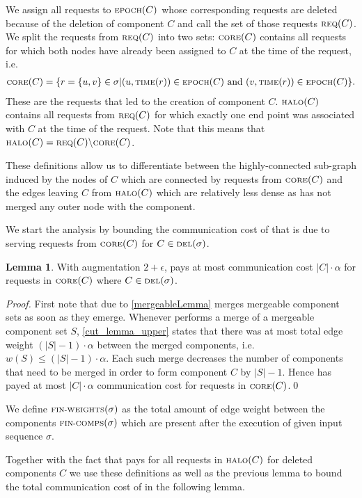 \documentclass[a4paper,xcolor=dvipsnames, tikz, 12pt]{article}
\newcommand{\nl}{\newline}
\newcommand{\crep}{\text{C{\scriptsize REP}}}
\newcommand{\del}{\text{\scriptsize DEL}}
\newcommand{\core}{\text{\scriptsize CORE}}
\newcommand{\halo}{\text{\scriptsize HALO}}
\newcommand{\req}{\text{\scriptsize REQ}}
\newcommand{\finalComps}{\text{\scriptsize FIN-COMPS}}
\newcommand{\finalWeights}{\text{\scriptsize FIN-WEIGHTS}}
\newcommand{\epoch}{\text{\scriptsize EPOCH}}
\newcommand{\reqTime}{\text{\scriptsize TIME}}
\theoremstyle{definition}
\newtheorem{lemma}[defi]{Lemma}
\begin{document}
We assign all requests to $\epoch(C)$ whose corresponding requests are deleted because of the deletion of component $C$ and call the set of those requests $\req(C)$.
We split the requests from $\req{}(C)$ into two sets: $\core(C)$ contains all requests for which both nodes have already been assigned to $C$ at the time of the request, i.e. 
\begin{align*}
\core(C)=\{r=\{u,v\}\in\sigma| (u,\reqTime(r))\in \epoch(C)\text{ and } (v, \reqTime(r))\in \epoch(C)\}.
\end{align*}
These are the requests that led to the creation of component $C$. 
$\halo(C)$ contains all requests from $\req(C)$ for which exactly one end point was associated with $C$ at the time of the request. Note that this means that $\halo(C)=\req(C)\backslash \core(C)$.

These definitions allow us to differentiate between the highly-connected sub-graph induced by the nodes of $C$ which are connected by requests from $\core(C)$ and the edges leaving $C$ from $\halo(C)$ which are relatively less dense as \crep{} has not merged any outer node with the component.

We start the analysis by bounding the communication cost of \crep{} that is due to serving requests from $\core(C)$ for $C\in\del{}(\sigma)$.

\begin{lemma}
	\label{core_comm_upper}
	With augmentation $2+\epsilon$, \crep{} pays at most communication cost $|C|\cdot\alpha$ for requests in $\core(C)$ where $C\in\del{}(\sigma)$.
\end{lemma}

\textit{Proof.} First note that due to \cref{mergeableLemma} \crep{} merges mergeable component sets as soon as they emerge.
Whenever \crep{} performs a merge of a mergeable component set $S$, \cref{cut_lemma_upper} states that there was at most total edge weight $(|S|-1)\cdot\alpha$ between the merged components, i.e. $w(S)\leq(|S|-1)\cdot\alpha$. Each such merge decreases the number of components that need to be merged in order to form component $C$ by $|S|-1$. Hence \crep{} has payed at most $|C|\cdot\alpha$ communication cost for requests in $\core(C)$.\qed\nl%

We define $\finalWeights{}(\sigma)$ as the total amount of edge weight between the components $\finalComps{}(\sigma)$ which are present after the execution of \crep{} given input sequence $\sigma$.

Together with the fact that \crep{} pays for all requests in $\halo(C)$ for deleted components $C$ we use these definitions as well as the previous lemma to bound the total communication cost of \crep{} in the following lemma.
\end{document}
